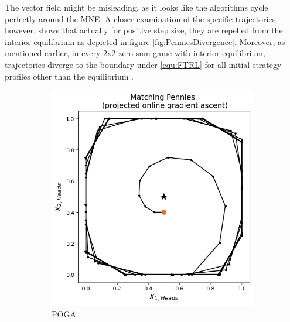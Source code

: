 The vector field might be misleading, as it looks like the algorithms cycle perfectly around the MNE. A closer examination of the specific trajectories, however, shows that actually for positive step size, they are repelled from the interior equilibrium as depicted in figure \ref{fig:PenniesDivergence}. Moreover, as mentioned earlier, in every 2x2 zero-sum game with interior equilibrium, trajectories diverge to the boundary under \ref{equ:FTRL} for all initial strategy profiles other than the equilibrium \cite{bailey}. 


\begin{figure}[H]
 \captionsetup{justification=centering}
\centering
\begin{subfigure}{.5\textwidth}
    \centering
    \includegraphics[width=\textwidth]{logos/Pennies5.png}
    \caption{POGA}
\end{subfigure}%
\begin{subfigure}{.5\textwidth}
    \centering

\end{subfigure}
\end{figure}
